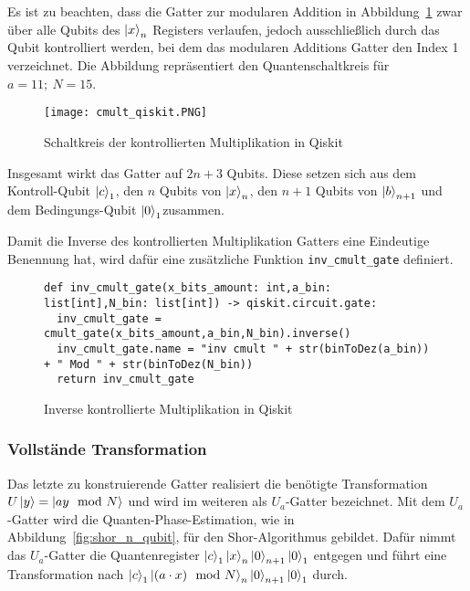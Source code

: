 Es ist zu beachten, dass die Gatter zur modularen Addition in Abbildung~\ref{fig:cmult_qiskit} zwar über 
alle Qubits des \(\ket{x}_n\) Registers verlaufen, 
jedoch ausschließlich durch das Qubit kontrolliert werden, 
bei dem das modularen Additions Gatter den Index 1 verzeichnet.
Die Abbildung repräsentiert den Quantenschaltkreis für \(a = 11;~N = 15\).

\begin{figure} [H]
  \caption{Schaltkreis der kontrollierten Multiplikation in Qiskit}
  \label{fig:cmult_qiskit}
  \texttt{[image: cmult\_qiskit.PNG]}
  \centering
  \end{figure}

Insgesamt wirkt das Gatter auf \(2n+3\) Qubits.
Diese setzen sich aus dem Kontroll-Qubit \(\ket{c}_1\), den \(n\) Qubits von \(\ket{x}_n\), 
den \(n+1\) Qubits von \(\ket{b}_{n+1}\) und dem Bedingungs-Qubit \(\ket{0}_1\)zusammen.

Damit die Inverse des kontrollierten Multiplikation Gatters eine Eindeutige Benennung hat, 
wird dafür eine zusätzliche Funktion \texttt{inv\_cmult\_gate} definiert.
\begin{figure}[H]
  \caption{Inverse kontrollierte Multiplikation in Qiskit}
  \label{code:InverseModularMultiplication}
\begin{verbatim}  
def inv_cmult_gate(x_bits_amount: int,a_bin: list[int],N_bin: list[int]) -> qiskit.circuit.gate:  
  inv_cmult_gate = cmult_gate(x_bits_amount,a_bin,N_bin).inverse()
  inv_cmult_gate.name = "inv cmult " + str(binToDez(a_bin)) + " Mod " + str(binToDez(N_bin))
  return inv_cmult_gate
  \end{verbatim}
\end{figure}

\subsubsection{Vollstände Transformation}

Das letzte zu konstruierende Gatter realisiert die benötigte Transformation \(U\ket{y} = \ket{ay \mod N}\) und 
wird im weiteren als \(U_a\)-Gatter bezeichnet.
Mit dem \(U_a\)-Gatter wird die Quanten-Phase-Estimation, 
wie in Abbildung~\ref{fig:shor_n_qubit}, für den Shor-Algorithmus gebildet.
Dafür nimmt das \(U_a\)-Gatter die Quantenregister \(\ket{c}_1\ket{x}_{n}\ket{0}_{n+1}\ket{0}_1\) entgegen und 
führt eine Transformation nach \(\ket{c}_1\ket{(a \cdot x) \mod N}_{n}\ket{0}_{n+1}\ket{0}_1\) durch.

